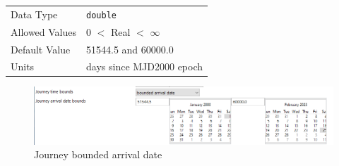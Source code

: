 \begin{enumerate}
                \begin{table}[H]
                    \hspace{2cm}
                    \begin{tabular}{ll}
                    Data Type & \verb|double| \\
                    Allowed Values & 0 $<$ Real $<$ $\infty$ \\
                    Default Value & 51544.5 and 60000.0\\
                    Units & days since MJD2000 epoch
                    \end{tabular}
                \end{table}

                \begin{figure}[H]
                    \centering
                    \includegraphics[width=1.0\textwidth]{../../shared_latex_inputs/images/pyemtg_journey_bounded_arrival.png}
                    \caption{Journey bounded arrival date}
                \end{figure}

    \end{enumerate}

